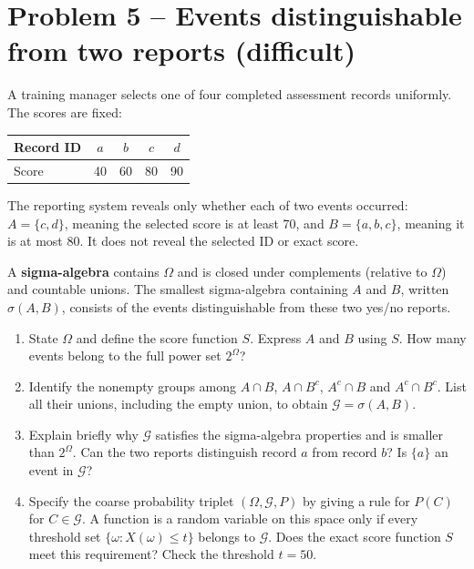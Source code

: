 \documentclass[11pt,a4paper]{article}
\begin{document}
\clearpage
\section*{Problem 5 -- Events distinguishable from two reports (difficult)}

A training manager selects one of four completed assessment records uniformly. The scores are fixed:

\begin{center}\begin{tabular}{lcccc}\toprule
Record ID & $a$ & $b$ & $c$ & $d$ \\
\midrule
Score & 40 & 60 & 80 & 90 \\
\bottomrule\end{tabular}\end{center}

The reporting system reveals only whether each of two events occurred: $A=\{c,d\}$, meaning the selected score is at least 70, and $B=\{a,b,c\}$, meaning it is at most 80. It does not reveal the selected ID or exact score.

A \textbf{sigma-algebra} contains $\Omega$ and is closed under complements (relative to $\Omega$) and countable unions. The smallest sigma-algebra containing $A$ and $B$, written $\sigma(A,B)$, consists of the events distinguishable from these two yes/no reports.

\begin{enumerate}
\item State $\Omega$ and define the score function $S$. Express $A$ and $B$ using $S$. How many events belong to the full power set $2^\Omega$?
\item Identify the nonempty groups among $A\cap B$, $A\cap B^c$, $A^c\cap B$ and $A^c\cap B^c$. List all their unions, including the empty union, to obtain $\mathcal G=\sigma(A,B)$.
\item Explain briefly why $\mathcal G$ satisfies the sigma-algebra properties and is smaller than $2^\Omega$. Can the two reports distinguish record $a$ from record $b$? Is $\{a\}$ an event in $\mathcal G$?
\item Specify the coarse probability triplet $(\Omega,\mathcal G,P)$ by giving a rule for $P(C)$ for $C\in\mathcal G$. A function is a random variable on this space only if every threshold set $\{\omega:X(\omega)\le t\}$ belongs to $\mathcal G$. Does the exact score function $S$ meet this requirement? Check the threshold $t=50$.
\end{enumerate}
\end{document}
